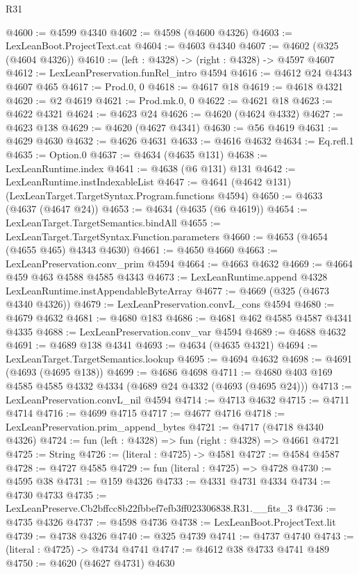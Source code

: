 \begin{lexlean}{R31}
\begin{coremodule}
@4600 := @4599 @4340
@4602 := @4598 (@4600 @4326)
@4603 := LexLeanBoot.ProjectText.cat
@4604 := @4603 @4340
@4607 := @4602 (@325 (@4604 @4326))
@4610 := (left : @4328) -> (right : @4328) -> @4597 @4607
@4612 := LexLeanPreservation.funRel_intro @4594
@4616 := @4612 @24 @4343 @4607 @465
@4617 := Prod.{0, 0}
@4618 := @4617 @18
@4619 := @4618 @4321
@4620 := @2 @4619
@4621 := Prod.mk.{0, 0}
@4622 := @4621 @18
@4623 := @4622 @4321
@4624 := @4623 @24
@4626 := @4620 (@4624 @4332)
@4627 := @4623 @138
@4629 := @4620 (@4627 @4341)
@4630 := @56 @4619
@4631 := @4629 @4630
@4632 := @4626 @4631
@4633 := @4616 @4632
@4634 := Eq.refl.{1}
@4635 := Option.{0}
@4637 := @4634 (@4635 @131)
@4638 := LexLeanRuntime.index
@4641 := @4638 (@6 @131) @131
@4642 := LexLeanRuntime.instIndexableList
@4647 := @4641 (@4642 @131) (LexLeanTarget.TargetSyntax.Program.functions @4594)
@4650 := @4633 (@4637 (@4647 @24))
@4653 := @4634 (@4635 (@6 @4619))
@4654 := LexLeanTarget.TargetSemantics.bindAll
@4655 := LexLeanTarget.TargetSyntax.Function.parameters
@4660 := @4653 (@4654 (@4655 @465) @4343 @4630)
@4661 := @4650 @4660
@4663 := LexLeanPreservation.conv_prim @4594
@4664 := @4663 @4632
@4669 := @4664 @459 @463 @4588 @4585 @4343
@4673 := LexLeanRuntime.append @4328 LexLeanRuntime.instAppendableByteArray
@4677 := @4669 (@325 (@4673 @4340 @4326))
@4679 := LexLeanPreservation.convL_cons @4594
@4680 := @4679 @4632
@4681 := @4680 @183
@4686 := @4681 @462 @4585 @4587 @4341 @4335
@4688 := LexLeanPreservation.conv_var @4594
@4689 := @4688 @4632
@4691 := @4689 @138 @4341
@4693 := @4634 (@4635 @4321)
@4694 := LexLeanTarget.TargetSemantics.lookup
@4695 := @4694 @4632
@4698 := @4691 (@4693 (@4695 @138))
@4699 := @4686 @4698
@4711 := @4680 @403 @169 @4585 @4585 @4332 @4334 (@4689 @24 @4332 (@4693 (@4695 @24)))
@4713 := LexLeanPreservation.convL_nil @4594
@4714 := @4713 @4632
@4715 := @4711 @4714
@4716 := @4699 @4715
@4717 := @4677 @4716
@4718 := LexLeanPreservation.prim_append_bytes
@4721 := @4717 (@4718 @4340 @4326)
@4724 := fun (left : @4328) => fun (right : @4328) => @4661 @4721
@4725 := String
@4726 := (literal : @4725) -> @4581
@4727 := @4584 @4587
@4728 := @4727 @4585
@4729 := fun (literal : @4725) => @4728
@4730 := @4595 @38
@4731 := @159 @4326
@4733 := @4331 @4731 @4334
@4734 := @4730 @4733
@4735 := LexLeanPreserve.Cb2bffcc8b22fbbef7efb3ff023306838.R31.__fits_3
@4736 := @4735 @4326
@4737 := @4598 @4736
@4738 := LexLeanBoot.ProjectText.lit
@4739 := @4738 @4326
@4740 := @325 @4739
@4741 := @4737 @4740
@4743 := (literal : @4725) -> @4734 @4741
@4747 := @4612 @38 @4733 @4741 @489
@4750 := @4620 (@4627 @4731) @4630

\end{coremodule}
\end{lexlean}
